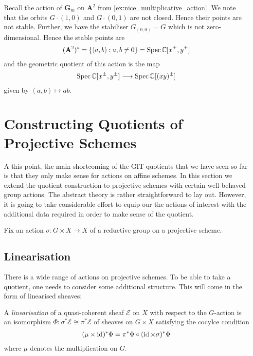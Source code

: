 \documentclass[12pt]{ociamthesis}  %
\begin{document}
\begin{example}
  Recall the action of $\mathbf G_m$ on $\mathbf A^2$ from
  \ref{ex:nice_multiplicative_action}. We note that the orbits
  $G\cdot(1,0)$ and $G\cdot(0,1)$ are not closed. Hence their points
  are not stable. Further, we have the stabiliser $G_{(0,0)}=G$ which
  is not zero-dimensional. Hence the stable points are
  \begin{align*}
    (\mathbf A^2)^s = \{(a,b):a,b\neq 0\} = \operatorname{Spec} \mathbb C[x^\pm,y^\pm]
  \end{align*}
  and the geometric quotient of this action is the map
  \begin{align*}
    \operatorname{Spec}\mathbb C[x^\pm,y^\pm]\longrightarrow\operatorname{Spec}\mathbb C[(xy)^\pm]
  \end{align*}
  given by $(a,b)\mapsto ab$.
\end{example}

\section{Constructing Quotients of Projective Schemes}

A this point, the main shortcoming of the GIT quotients that
we have seen so far is that they only make sense for actions on
affine schemes. In this section we extend the quotient construction
to projective schemes with certain well-behaved group actions.
The abstract theory is rather straightforward to lay out. However,
it is going to take considerable effort to equip our the actions of interest
with the additional data required in order to make sense of the quotient.

Fix an action $\sigma : G\times X\to X$ of a reductive
group on a projective scheme.

\subsection{Linearisation}

There is a wide range of actions on projective schemes. To be able to
take a quotient, one needs to consider some additional structure. This
will come in the form of linearised sheaves:

\begin{definition}
  A \emph{linearisation} of a quasi-coherent sheaf
  $\mathscr E$ on $X$ with respect to the $G$-action
  is an isomorphism $\Phi : \sigma^*\mathscr E \cong\pi^*\mathscr E$
  of sheaves on $G\times X$ satisfying the cocylce condition
  \begin{align}\label{eq:cocyle_condition}
    (\mu \times \operatorname{id})^*\Phi = \pi^*\Phi \circ (\operatorname{id}\times\sigma)^*\Phi
  \end{align}
  where $\mu$ denotes the multiplication on $G$.
\end{definition}
\end{document}
